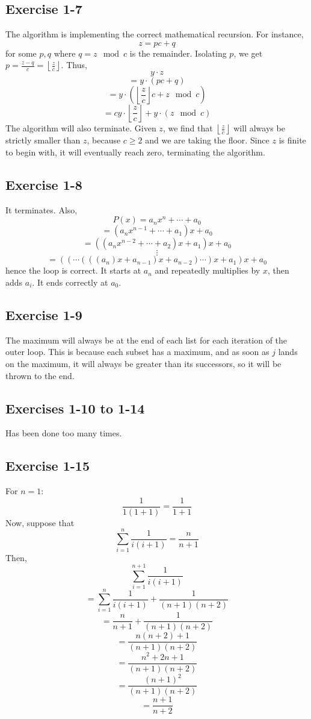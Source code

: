 \documentclass{book}
\begin{document}
\subsection*{Exercise 1-7}
The algorithm is implementing the correct mathematical recursion. For instance,
$$z = pc + q$$
for some $p, q$ where $q = z \mod c$ is the remainder. Isolating $p$, we get $p = \frac{z - q}{c} = \left\lfloor \frac{z}{c} \right\rfloor$. Thus,
$$y \cdot z$$
$$= y \cdot (pc + q)$$
$$= y \cdot \left(\left\lfloor \frac{z}{c} \right\rfloor c + z \mod c\right)$$
$$= cy \cdot \left\lfloor \frac{z}{c} \right\rfloor + y \cdot (z \mod c)$$
The algorithm will also terminate. Given $z$, we find that $\left\lfloor \frac{z}{c} \right\rfloor$ will always be strictly smaller than $z$, because $c \geq 2$ and we are taking the floor. Since $z$ is finite to begin with, it will eventually reach zero, terminating the algorithm.

\subsection*{Exercise 1-8}
It terminates. Also,
$$P(x) = a_nx^n + \cdots + a_0$$
$$= (a_nx^{n - 1} + \cdots + a_1)x + a_0$$
$$= ((a_nx^{n - 2} + \cdots + a_2)x + a_1)x + a_0$$
$$\vdots$$
$$= ((\cdots(((a_n)x + a_{n - 1})x + a_{n - 2}) \cdots)x + a_1)x + a_0$$
hence the loop is correct. It starts at $a_n$ and repeatedly multiplies by $x$, then adds $a_i$. It ends correctly at $a_0$.

\subsection*{Exercise 1-9}
The maximum will always be at the end of each list for each iteration of the outer loop. This is because each subset has a maximum, and as soon as $j$ lands on the maximum, it will always be greater than its successors, so it will be thrown to the end.

\subsection*{Exercises 1-10 to 1-14}
Has been done too many times.

\subsection*{Exercise 1-15}
For $n = 1$:
$$\frac{1}{1(1 + 1)} = \frac{1}{1 + 1}$$
Now, suppose that
$$\sum_{i = 1}^n \frac{1}{i(i + 1)} = \frac{n}{n + 1}$$
Then,
$$\sum_{i = 1}^{n + 1} \frac{1}{i(i + 1)}$$
$$= \sum_{i = 1}^n \frac{1}{i(i + 1)} + \frac{1}{(n + 1)(n + 2)}$$
$$= \frac{n}{n + 1} + \frac{1}{(n + 1)(n + 2)}$$
$$= \frac{n(n + 2) + 1}{(n + 1)(n + 2)}$$
$$= \frac{n^2 + 2n + 1}{(n + 1)(n + 2)}$$
$$= \frac{(n + 1)^2}{(n + 1)(n + 2)}$$
$$= \frac{n + 1}{n + 2}$$
\end{document}
